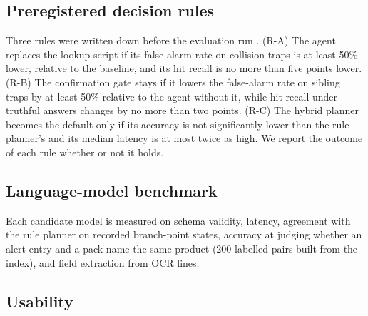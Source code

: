 \subsection{Preregistered decision rules}
Three rules were written down before the evaluation run \cite{nosek2018preregistration}. (R-A) The agent replaces the lookup script if its false-alarm rate on collision traps is at least 50\% lower, relative to the baseline, and its hit recall is no more than five points lower. (R-B) The confirmation gate stays if it lowers the false-alarm rate on sibling traps by at least 50\% relative to the agent without it, while hit recall under truthful answers changes by no more than two points. (R-C) The hybrid planner becomes the default only if its accuracy is not significantly lower than the rule planner's and its median latency is at most twice as high. We report the outcome of each rule whether or not it holds.

\subsection{Language-model benchmark}
Each candidate model is measured on schema validity, latency, agreement with the rule planner on recorded branch-point states, accuracy at judging whether an alert entry and a pack name the same product (200 labelled pairs built from the index), and field extraction from OCR lines.

\subsection{Usability}
